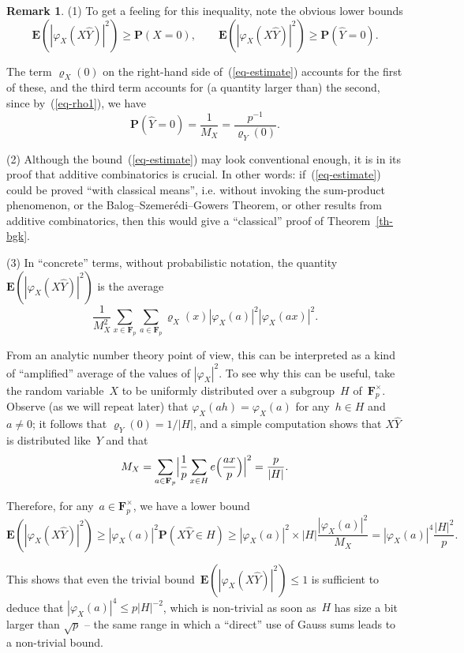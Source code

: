 \documentclass[12pt]{amsart}
\renewcommand{\leq}{\leqslant}
\renewcommand{\geq}{\geqslant}
\numberwithin{equation}{section}
\newcommand{\Ff}{\mathbf{F}}
\newcommand{\proba}{\mathbf{P}}
\newcommand{\expect}{\mathbf{E}}
\renewcommand{\rho}{\varrho}
\theoremstyle{plain}
\theoremstyle{remark}
\theoremstyle{definition}
\newtheorem{remark}[theorem]{Remark}
\renewcommand{\geq}{\geqslant}
\renewcommand{\leq}{\leqslant}
\begin{document}
\begin{remark}\label{rm-comments}
  (1) To get a feeling for this inequality, note the obvious lower
  bounds
  $$
  \expect(|\varphi_X(X\widehat{Y})|^2)\geq \proba(X=0),\quad\quad
  \expect(|\varphi_X(X\widehat{Y})|^2)\geq \proba(\widehat{Y}=0).
  $$

  The term $\rho_X(0)$ on the right-hand side of~(\ref{eq-estimate})
  accounts for the first of these, and the third term accounts for (a
  quantity larger than) the second, since by~(\ref{eq-rho1}), we have
  $$
  \proba(\widehat{Y}=0)=\frac{1}{M_X}=\frac{p^{-1}}{\rho_Y(0)}.
  $$

  (2) Although the bound~(\ref{eq-estimate}) may look conventional
  enough, it is in its proof that additive combinatorics is crucial. In
  other words: if~(\ref{eq-estimate}) could be proved ``with classical
  means'', i.e. without invoking the sum-product phenomenon, or the
  Balog--Szemerédi--Gowers Theorem, or other results from additive
  combinatorics, then this would give a ``classical'' proof of
  Theorem~\ref{th-bgk}.
  
  (3) In ``concrete'' terms, without probabilistic notation, the
  quantity $\expect(|\varphi_X(X\widehat{Y})|^2)$ is the average
  $$
  \frac{1}{M_X^2}\sum_{x\in\Ff_p}\sum_{a\in\Ff_p}\rho_X(x)
  |\varphi_X(a)|^2|\varphi_X(ax)|^2.
  $$

  From an analytic number theory point of view, this can be interpreted
  as a kind of ``amplified'' average of the values of
  $|\varphi_X|^2$. To see why this can be useful, take the random
  variable~$X$ to be uniformly distributed over a subgroup~$H$
  of~$\Ff_p^{\times}$. Observe (as we will repeat later) that
  $\varphi_{X}(ah)=\varphi_X(a)$ for any~$h\in H$ and~$a\not=0$; it
  follows that $\rho_Y(0)=1/|H|$, and a simple computation shows that
  $X\widehat{Y}$ is distributed like~$Y$ and that
  $$
  M_X=\sum_{a\in\Ff_p}\Bigl|\frac{1}{p} \sum_{x\in
    H}e\Bigl(\frac{ax}{p}\Bigr)\Bigr|^2=\frac{p}{|H|}.
  $$

  Therefore, for any~$a\in\Ff_p^{\times}$, we have a lower
  bound   
  $$
  \expect(|\varphi_X(X\widehat{Y})|^2)\geq
  |\varphi_X(a)|^2\proba(X\widehat{Y}\in H)\geq |\varphi_X(a)|^2
  \times
  |H|\frac{|\varphi_X(a)|^2}{M_X}=|\varphi_X(a)|^4\frac{|H|^2}{p}. 
  $$

  This shows that even the trivial
  bound~$\expect(|\varphi_X(X\widehat{Y})|^2)\leq 1$ is sufficient to
  deduce that $|\varphi_X(a)|^4\leq p|H|^{-2}$, which is non-trivial as
  soon as~$H$ has size a bit larger than $\sqrt{p}$ -- the same range in
  which a ``direct'' use of Gauss sums leads to a non-trivial bound.


\end{remark}
\end{document}
